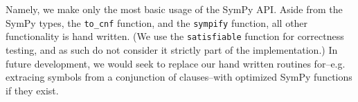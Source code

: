 \documentclass[12pt, conference, compsocconf]{IEEEtran}
\begin{document}
Namely, we make only the most basic usage of the SymPy API. 
Aside from the SymPy types, the \texttt{to\_cnf} function, and the \texttt{sympify} function, all other functionality is hand written. 
(We use the \texttt{satisfiable} function for correctness testing, and as such do not consider it strictly part of the implementation.) 
In future development, we would seek to replace our hand written routines for--e.g. extracing symbols from a conjunction of clauses--with optimized SymPy functions if they exist. 





\end{document}
